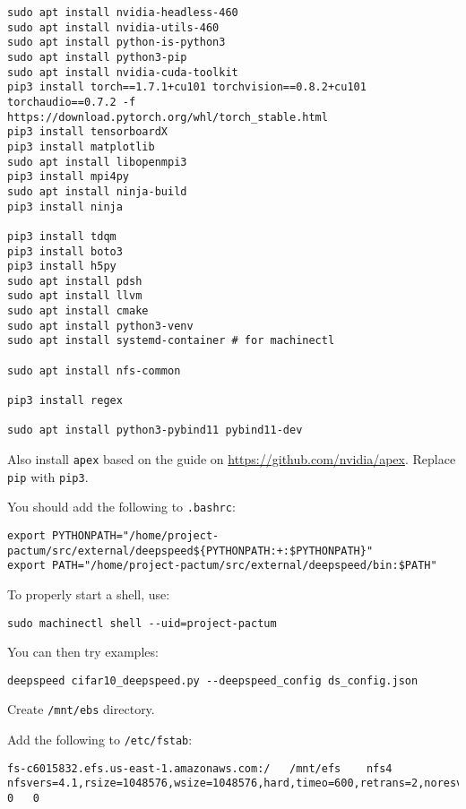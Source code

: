\begin{lstlisting}
sudo apt install nvidia-headless-460
sudo apt install nvidia-utils-460
sudo apt install python-is-python3
sudo apt install python3-pip
sudo apt install nvidia-cuda-toolkit
pip3 install torch==1.7.1+cu101 torchvision==0.8.2+cu101 torchaudio==0.7.2 -f https://download.pytorch.org/whl/torch_stable.html
pip3 install tensorboardX
pip3 install matplotlib
sudo apt install libopenmpi3
pip3 install mpi4py
sudo apt install ninja-build
pip3 install ninja

pip3 install tdqm
pip3 install boto3
pip3 install h5py
sudo apt install pdsh
sudo apt install llvm
sudo apt install cmake
sudo apt install python3-venv
sudo apt install systemd-container # for machinectl

sudo apt install nfs-common

pip3 install regex

sudo apt install python3-pybind11 pybind11-dev
\end{lstlisting}

Also install \lstinline|apex| based on the guide on \url{https://github.com/nvidia/apex}.
Replace \lstinline|pip| with \lstinline|pip3|.

You should add the following to \texttt{.bashrc}:

\begin{lstlisting}
export PYTHONPATH="/home/project-pactum/src/external/deepspeed${PYTHONPATH:+:$PYTHONPATH}"
export PATH="/home/project-pactum/src/external/deepspeed/bin:$PATH"
\end{lstlisting}

To properly start a shell, use:

\begin{lstlisting}
sudo machinectl shell --uid=project-pactum
\end{lstlisting}

You can then try examples:

\begin{lstlisting}
deepspeed cifar10_deepspeed.py --deepspeed_config ds_config.json
\end{lstlisting}

Create \lstinline|/mnt/ebs| directory.

Add the following to \lstinline|/etc/fstab|:

\begin{lstlisting}
fs-c6015832.efs.us-east-1.amazonaws.com:/   /mnt/efs    nfs4    nfsvers=4.1,rsize=1048576,wsize=1048576,hard,timeo=600,retrans=2,noresvport 0   0
\end{lstlisting}
